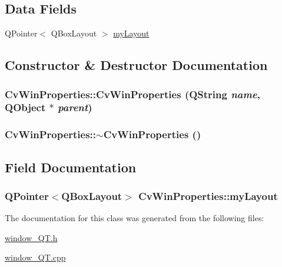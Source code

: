 \subsection*{Data Fields}
\begin{DoxyCompactItemize}
\item 
QPointer$<$ QBoxLayout $>$ \hyperlink{classCvWinProperties_a7b02e9dde3e939c4a3f7126f116247af}{myLayout}
\end{DoxyCompactItemize}


\subsection{Constructor \& Destructor Documentation}
\hypertarget{classCvWinProperties_a916ba2a24b09baaa9bb9efd7d16606e3}{
\subsubsection[{CvWinProperties}]{\setlength{\rightskip}{0pt plus 5cm}CvWinProperties::CvWinProperties (QString {\em name}, \/  QObject $\ast$ {\em parent})}}
\label{classCvWinProperties_a916ba2a24b09baaa9bb9efd7d16606e3}
\hypertarget{classCvWinProperties_a0953344aa7f41767c0da7ee59b17e0bb}{
\subsubsection[{$\sim$CvWinProperties}]{\setlength{\rightskip}{0pt plus 5cm}CvWinProperties::$\sim$CvWinProperties ()}}
\label{classCvWinProperties_a0953344aa7f41767c0da7ee59b17e0bb}


\subsection{Field Documentation}
\hypertarget{classCvWinProperties_a7b02e9dde3e939c4a3f7126f116247af}{
\subsubsection[{myLayout}]{\setlength{\rightskip}{0pt plus 5cm}QPointer$<$QBoxLayout$>$ {\bf CvWinProperties::myLayout}}}
\label{classCvWinProperties_a7b02e9dde3e939c4a3f7126f116247af}


The documentation for this class was generated from the following files:\begin{DoxyCompactItemize}
\item 
\hyperlink{window__QT_8h}{window\_\-QT.h}\item 
\hyperlink{window__QT_8cpp}{window\_\-QT.cpp}\end{DoxyCompactItemize}

